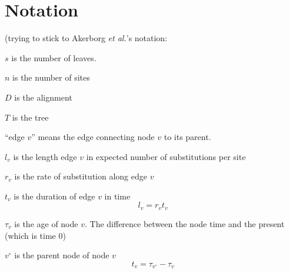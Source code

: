 \documentclass{llncs}
\newcommand{\etal}[0]{{\em et al.}\xspace}
\newcommand{\numLeaves}[0]{\ensuremath{s}\xspace}
\newcommand{\numSites}[0]{\ensuremath{n}\xspace}
\newcommand{\dataMatrix}[0]{\ensuremath{D}\xspace}
\newcommand{\tree}[0]{\ensuremath{T}\xspace}
\newcommand{\edgeLen}[1]{\ensuremath{l_{#1}}\xspace}
\newcommand{\rate}[1]{\ensuremath{r_{#1}}\xspace}
\newcommand{\duration}[1]{\ensuremath{t_{#1}}\xspace}
\newcommand{\age}[1]{\ensuremath{\tau_{#1}}\xspace}
\newcommand{\parent}[1]{\ensuremath{{#1}^{\circ}}\xspace}
\begin{document}
\section{Notation}
(trying to stick to Akerborg \etal's notation:
\begin{compactitem}
    \item[\numLeaves] is the number of leaves.
    \item[\numSites] is the number of sites
    \item[\dataMatrix] is the alignment
    \item[\tree] is the tree
    \item[``edge $v$''] means the edge connecting node $v$ to its parent.
    \item[\edgeLen{v}] is the length edge $v$ in expected number of substitutions per site
    \item[\rate{v}] is the rate of substitution along edge $v$
    \item[\duration{v}] is the duration of edge $v$ in time
\begin{equation}
    \edgeLen{v} = \rate{v}\duration{v}
\end{equation}
    \item[\age{v}] is the age of node $v$. The difference between the node time and the present (which is time 0)
    \item[\parent{v}] is the parent node of node $v$
\begin{equation}
    \duration{v} = \age{\parent{v}} - \age{v}
\end{equation}
\end{compactitem}



%
\end{document}

